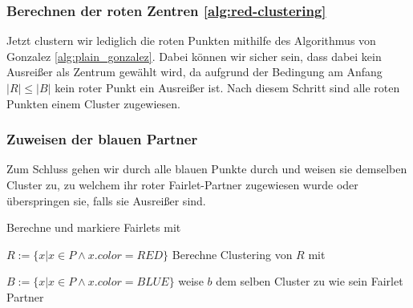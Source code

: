         
        \subsubsection{Berechnen der roten Zentren \ref{alg:red-clustering}} 
            Jetzt clustern wir lediglich die roten Punkten mithilfe des Algorithmus von Gonzalez \ref{alg:plain_gonzalez}. Dabei können wir sicher sein, dass dabei kein Ausreißer als Zentrum gewählt wird, da aufgrund der Bedingung am Anfang $|R| \leq |B|$ kein roter Punkt ein Ausreißer ist. \newline
            Nach diesem Schritt sind alle roten Punkten einem Cluster zugewiesen. 
        
        \subsubsection{Zuweisen der blauen Partner}
            Zum Schluss gehen wir durch alle blauen Punkte durch und weisen sie demselben Cluster zu, zu welchem ihr roter Fairlet-Partner zugewiesen wurde oder überspringen sie, falls sie Ausreißer sind.
    



        \begin{algorithm}
            \caption{Red Clustering Algorithmus}\label{alg:red-clustering}
            \begin{algorithmic}[1]
                    \State Berechne und markiere Fairlets mit 

                    \State $R := \{x | x \in P \wedge x.color = RED\}$ 
                    \State Berechne Clustering von $R$ mit 

                    \State $B := \{x | x \in P \wedge x.color = BLUE\}$ 
                            \State weise $b$ dem selben Cluster zu wie sein Fairlet Partner
                        \EndIf
                    \EndFor
                \EndFunction
            \end{algorithmic}
        \end{algorithm} 
















